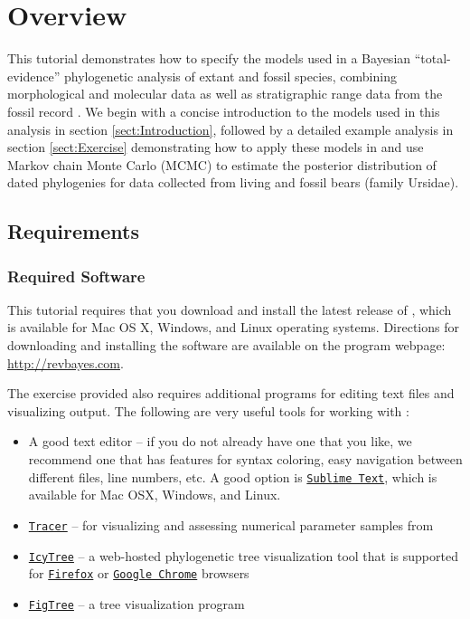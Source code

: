 
\section{Overview}\label{sect:Overview}

This tutorial demonstrates how to specify the models used in a Bayesian ``total-evidence'' phylogenetic analysis of extant and fossil species, combining morphological and molecular data as well as stratigraphic range data from the fossil record \citep[\EG][]{Ronquist2012a,Zhang2016,Gavryushkina2016}.
We begin with a concise introduction to the models used in this analysis in section \ref{sect:Introduction}, followed by a detailed example analysis in section \ref{sect:Exercise} demonstrating how to apply these models in \RevBayes \citep{Hoehna2017a} and use Markov chain Monte Carlo (MCMC) to estimate the posterior distribution of dated phylogenies for data collected from living and fossil bears (family Ursidae).

\bigskip
\subsection{Requirements}\label{subsect:Overview-Requirements}

\subsubsection{Required Software}\label{subsub:Req-Software}
This tutorial requires that you download and install the latest release of \RevBayes \citep{Hoehna2017a}, which is available for Mac OS X, Windows, and Linux operating systems. 
Directions for downloading and installing the software are available on the program webpage:
\href{http://revbayes.com/}{http://revbayes.com}.

The exercise provided also requires additional programs for editing text files and visualizing output. 
The following are very useful tools for working with \RevBayes:
\begin{itemize}[noitemsep,topsep=0pt]
\item A good text editor -- if you do not already have one that you like, we recommend one that has features for syntax coloring, easy navigation between different files, line numbers, etc.
A good option is \href{http://www.sublimetext.com/}{\tt Sublime Text}, which is available for Mac OSX, Windows, and Linux.
\item \href{http://tree.bio.ed.ac.uk/software/tracer/}{\tt Tracer} -- for visualizing and assessing numerical parameter samples from \RevBayes
\item \href{http://tgvaughan.github.io/icytree/}{\tt IcyTree} -- a web-hosted phylogenetic tree visualization tool that is supported for \href{https://www.mozilla.org/en-US/firefox/products/}{\tt Firefox} or \href{https://www.google.com/chrome/}{\tt Google Chrome} browsers 
\item \href{http://tree.bio.ed.ac.uk/software/figtree/}{\tt FigTree} -- a tree visualization program
\end{itemize}

